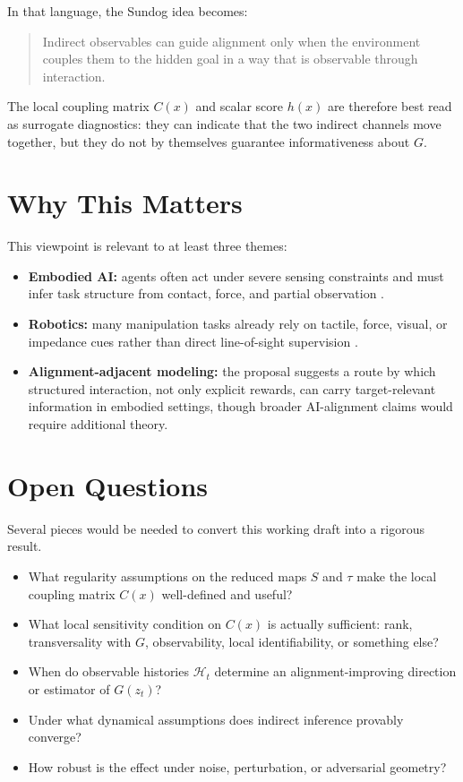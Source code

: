 \documentclass[11pt]{article}
\begin{document}
In that language, the Sundog idea becomes:

\begin{quote}
Indirect observables can guide alignment only when the environment couples them to the hidden goal in a way that is observable through interaction.
\end{quote}

The local coupling matrix $C(x)$ and scalar score $h(x)$ are therefore best read as surrogate diagnostics: they can indicate that the two indirect channels move together, but they do not by themselves guarantee informativeness about $G$.

\section{Why This Matters}

This viewpoint is relevant to at least three themes:

\begin{itemize}
    \item \textbf{Embodied AI:} agents often act under severe sensing constraints and must infer task structure from contact, force, and partial observation \cite{kaelbling1998}.
    \item \textbf{Robotics:} many manipulation tasks already rely on tactile, force, visual, or impedance cues rather than direct line-of-sight supervision \cite{chaumette2006,dahiya2010}.
    \item \textbf{Alignment-adjacent modeling:} the proposal suggests a route by which structured interaction, not only explicit rewards, can carry target-relevant information in embodied settings, though broader AI-alignment claims would require additional theory.
\end{itemize}

\section{Open Questions}

Several pieces would be needed to convert this working draft into a rigorous result.

\begin{itemize}
    \item What regularity assumptions on the reduced maps $S$ and $\tau$ make the local coupling matrix $C(x)$ well-defined and useful?
    \item What local sensitivity condition on $C(x)$ is actually sufficient: rank, transversality with $G$, observability, local identifiability, or something else?
    \item When do observable histories $\mathcal{H}_t$ determine an alignment-improving direction or estimator of $G(z_t)$?
    \item Under what dynamical assumptions does indirect inference provably converge?
    \item How robust is the effect under noise, perturbation, or adversarial geometry?
\end{itemize}
\end{document}
